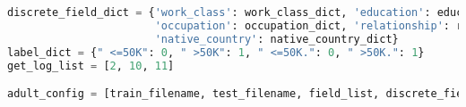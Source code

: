 \documentclass[withoutpreface,bwprint]{cumcmthesis}
\begin{document}
\begin{appendix}
\begin{lstlisting}[language=python]
discrete_field_dict = {'work_class': work_class_dict, 'education': education_dict, 'marital_status': marital_status_dict,
                       'occupation': occupation_dict, 'relationship': relationship_dict, 'race': race_dict, 'sex': sex_dict,
                       'native_country': native_country_dict}
label_dict = {" <=50K": 0, " >50K": 1, " <=50K.": 0, " >50K.": 1}
get_log_list = [2, 10, 11]

adult_config = [train_filename, test_filename, field_list, discrete_field_dict, label_dict, get_log_list]
\end{lstlisting}

\end{appendix}
\end{document}
